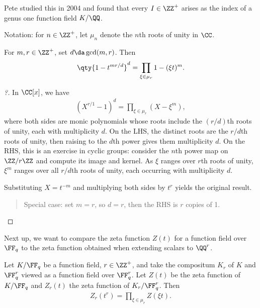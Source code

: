 \begin{remark}

Pete studied this in 2004 and found that every \(I\in \ZZ^+\) arises as
the index of a genus one function field \(K/\QQ\).

\end{remark}

Notation: for \(n\in\ZZ^+\), let \(\mu_n\) denote the \(n\)th roots of
unity in \(\CC\).

\begin{lemma}[?]

For \(m, r\in \ZZ^+\), set \(d \da \gcd(m, r)\). Then
\begin{align*}  
\qty{1-t^{mr/d}}^d = \prod_{\xi\in \mu_r}  1 - (\xi t)^m
.\end{align*}

\end{lemma}

\begin{proof}[?]

In \(\CC[x]\), we have
\begin{align*}  
(X^{r/1} - 1)^d = \prod_{\xi\in \mu_r}(X - \xi^m)
,\end{align*} where both sides are monic polynomials whose roots include
the \((r/d)\)th roots of unity, each with multiplicity \(d\). On the
LHS, the distinct roots are the \(r/d\)th roots of unity, then raising
to the \(d\)th power gives them multiplicity \(d\). On the RHS, this is
an exercise in cyclic groups: consider the \(n\)th power map on
\(\ZZ/r\ZZ\) and compute its image and kernel. As \(\xi\) ranges over
\(r\)th roots of unity, \(\xi^m\) ranges over all \(r/d\)th roots of
unity, each occurring with multiplicity \(d\).

Substituting \(X= t^{-m}\) and multiplying both sides by \(t^r\) yields
the original result.

\begin{quote}
Special case: set \(m=r\), so \(d=r\), then the RHS is \(r\) copies of
1.
\end{quote}

\end{proof}

Next up, we want to compare the zeta function \(Z(t)\) for a function
field over \(\FF_q\) to the zeta function obtained when extending
scalars to \(\QQ^r\).

\begin{proposition}

Let \(K/\FF_q\) be a function field, \(r\in \ZZ^+\), and take the
compositum \(K_r\) of \(K\) and \(\FF_q^r\) viewed as a function field
over \(\FF_q^r\). Let \(Z(t)\) be the zeta function of \(K/\FF_q\) and
\(Z_r(t)\) the zeta function of \(K_r/\FF_q^r\). Then
\begin{align*}  
Z_r(t^r) = \prod_{\xi \in \mu_r} Z(\xi t)
.\end{align*}

\end{proposition}

